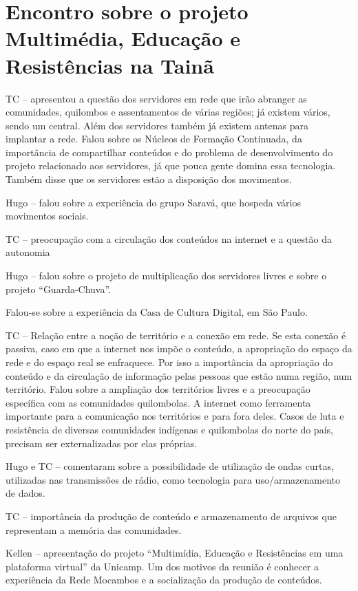 \documentclass[a4paper, 11pt, oneside]{Relatorio_sem_2}  %
\begin{document}
\section{Encontro sobre o projeto Multimédia, Educação e Resistências na Tainã}
TC – apresentou a questão dos servidores em rede que irão abranger as
comunidades, quilombos e assentamentos de várias regiões; já existem
vários, sendo um central. Além dos servidores também já existem
antenas para implantar a rede. Falou sobre os Núcleos de Formação
Continuada, da importância de compartilhar conteúdos e do problema de
desenvolvimento do projeto relacionado aos servidores, já que pouca
gente domina essa tecnologia. Também disse que os servidores estão a
disposição dos movimentos.

Hugo – falou sobre a experiência do grupo Saravá, que hospeda vários
movimentos sociais.

TC – preocupação com a circulação dos conteúdos na internet e a
questão da autonomia

Hugo – falou sobre o projeto de multiplicação dos servidores livres e
sobre o projeto “Guarda-Chuva”.

Falou-se sobre a experiência da Casa de Cultura Digital, em São Paulo.

TC – Relação entre a noção de território e a conexão em rede. Se esta
conexão é passiva, caso em que a internet nos impõe o conteúdo, a
apropriação do espaço da rede e do espaço real se enfraquece. Por isso
a importância da apropriação do conteúdo e da circulação de informação
pelas pessoas que estão numa região, num território. Falou sobre a
ampliação dos territórios livres e a preocupação específica com as
comunidades quilombolas. A internet como ferramenta importante para a
comunicação nos territórios e para fora deles. Casos de luta e
resistência de diversas comunidades indígenas e quilombolas do norte
do país, precisam ser externalizadas por elas próprias.

Hugo e TC – comentaram sobre a possibilidade de utilização de ondas
curtas, utilizadas nas transmissões de rádio, como tecnologia para
uso/armazenamento de dados.

TC – importância da produção de conteúdo e armazenamento de arquivos
que representam a memória das comunidades.

Kellen – apresentação do projeto “Multimídia, Educação e Resistências
em uma plataforma virtual” da Unicamp. Um dos motivos da reunião é
conhecer a experiência da Rede Mocambos e a socialização da produção
de conteúdos.
\end{document}
